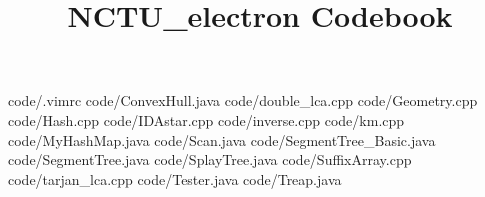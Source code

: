 \documentclass {article}
\begin{document}
\title {NCTU_electron Codebook}
 {code/.vimrc}
 {code/ConvexHull.java}
 {code/double_lca.cpp}
 {code/Geometry.cpp}
 {code/Hash.cpp}
 {code/IDAstar.cpp}
 {code/inverse.cpp}
 {code/km.cpp}
 {code/MyHashMap.java}
 {code/Scan.java}
 {code/SegmentTree_Basic.java}
 {code/SegmentTree.java}
 {code/SplayTree.java}
 {code/SuffixArray.cpp}
 {code/tarjan_lca.cpp}
 {code/Tester.java}
 {code/Treap.java}
\end{document}
